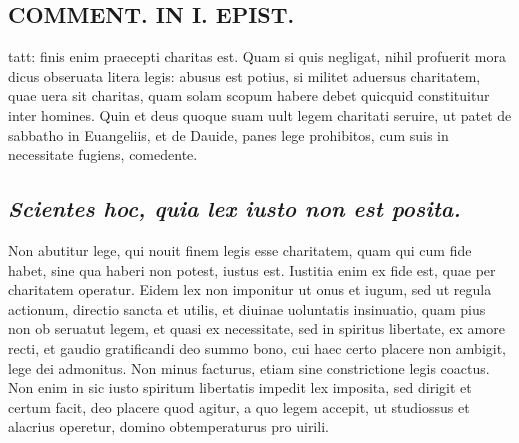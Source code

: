 \documentclass{article}
\begin{document}
\begin{pages}
\section*{COMMENT. IN I. EPIST. }
\marginpar{[ p.470 ]}\pstart tatt: finis enim praecepti charitas est. Quam si quis negligat, nihil profuerit mora dicus obseruata litera legis: abusus est potius, si militet aduersus charitatem, quae uera sit charitas, quam solam scopum habere debet quicquid constituitur inter homines. Quin et deus quoque suam uult legem charitati seruire, ut patet de sabbatho in Euangeliis, et de Dauide, panes lege prohibitos, cum suis in necessitate fugiens, comedente.  \pend
{}
{}
\subsection*{\textit{Scientes hoc, quia lex iusto non est posita. }}\pstart Non abutitur lege, qui nouit finem legis esse charitatem, quam qui cum fide habet, sine qua haberi non potest, iustus est. Iustitia enim ex fide est, quae per charitatem operatur. Eidem lex non imponitur ut onus et iugum, sed ut regula actionum, directio sancta et utilis, et diuinae uoluntatis insinuatio, quam pius non ob seruatut legem, et quasi ex necessitate, sed in spiritus libertate, ex amore recti, et gaudio gratificandi deo summo bono, cui haec certo placere non ambigit, lege dei admonitus. Non minus facturus, etiam sine constrictione legis coactus. Non enim in sic iusto spiritum libertatis impedit lex imposita, sed dirigit et certum facit, deo placere quod agitur, a quo legem accepit, ut studiossus et alacrius operetur, domino obtemperaturus pro uirili.  \pend
{}
{}

\end{pages}
\end{document}
